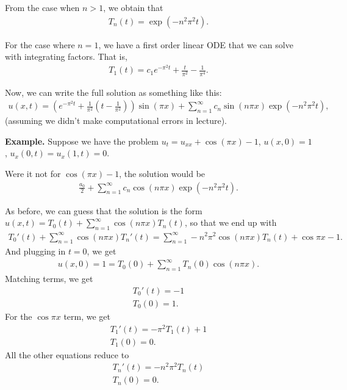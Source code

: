 \documentclass{article}
\begin{document}
From the case when $n > 1$, we obtain that
\begin{align*}
  T_n(t) = \exp \left( - n^2 \pi^2 t \right).
\end{align*}

For the case where $n = 1$, we have a first order linear ODE that we can solve with integrating factors.  That is,
\begin{align*}
  T_1(t) = c_1 e^{- \pi^2 t} + \frac{t}{\pi^2} - \frac{1}{\pi^4}.
\end{align*}

Now, we can write the full solution as something like this:
\begin{align*}
  u(x, t) =  \left( e^{- \pi^2 t} + \frac{1}{\pi^2} \left( t - \frac{1}{\pi^2} \right) \right) \sin (\pi x) + \sum_{n=1}^{\infty}  c_n \sin (n \pi x) \exp \left( - n^2 \pi^2 t \right),
\end{align*}
(assuming we didn't make computational errors in lecture).

{\bf Example.} Suppose we have the problem $u_{t} = u_{xx} + \cos (\pi x) - 1$, $u(x, 0) = 1$, $u_x(0, t) = u_x(1, t) = 0$.

Were it not for $\cos(\pi x) - 1$, the solution would be
\begin{align*}
  \frac{a_0}{2} + \sum_{n=1}^{\infty} c_n \cos (n \pi x) \exp \left( - n^2 \pi^2 t \right).
\end{align*}

As before, we can guess that the solution is the form $u(x, t) = T_0(t) + \sum_{n=1}^{\infty} \cos (n \pi x) T_n(t)$, so that we end up with
\begin{align*}
  T_0'(t) + \sum_{n=1}^{\infty} \cos (n \pi x) T_n'(t) = \sum_{n=1}^{\infty} -n^2 \pi^2 \cos (n \pi x) T_n(t) + \cos \pi x - 1.
\end{align*}
And plugging in $t = 0$, we get
\begin{align*}
  u(x, 0) = 1 = T_0(0) + \sum_{n=1}^{\infty} T_n(0) \cos(n \pi x).
\end{align*}
Matching terms, we get
\begin{align*}
  T_0'(t) = -1  \\
  T_0(0)= 1.
\end{align*}
For the $\cos \pi x$ term, we get
\begin{align*}
  T_1'(t) = -\pi^2 T_1(t) + 1 \\
  T_1(0) = 0.
\end{align*}
All the other equations reduce to
\begin{align*}
  T_n'(t) = -n^2 \pi^2 T_n(t) \\
  T_n(0) = 0.
\end{align*}
\end{document}
